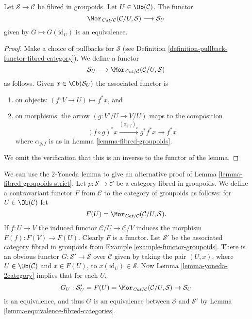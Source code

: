 \begin{lemma}
\label{lemma-yoneda-2category}
Let $\mathcal{S}\to \mathcal{C}$ be fibred in groupoids.
Let $U \in \Ob(\mathcal{C})$.
The functor
$$
\Mor_{\textit{Cat}/\mathcal{C}}(\mathcal{C}/U, \mathcal{S})
\longrightarrow
\mathcal{S}_U
$$
given by $G \mapsto G(\text{id}_U)$ is an equivalence.
\end{lemma}

\begin{proof}
Make a choice of pullbacks for $\mathcal{S}$
(see Definition \ref{definition-pullback-functor-fibred-category}).
We define a functor
$$
\mathcal{S}_U
\longrightarrow
\Mor_{\textit{Cat}/\mathcal{C}}(\mathcal{C}/U, \mathcal{S})
$$
as follows. Given
$x \in \Ob(\mathcal{S}_U)$
the associated functor is
\begin{enumerate}
\item on objects: $(f : V \to U) \mapsto f^*x$, and
\item on morphisms: the arrow $(g : V'/U \to V/U)$ maps to
the composition
$$
(f \circ g)^*x \xrightarrow{(\alpha_{g, f})_x} g^*f^*x \rightarrow f^*x
$$
where $\alpha_{g, f}$ is as in Lemma \ref{lemma-fibred-groupoids}.
\end{enumerate}
We omit the verification that this is an inverse to the functor
of the lemma.
\end{proof}

\begin{remark}
\label{remark-alternative-fibred-groupoids-strict}
We can use the $2$-Yoneda lemma to give an alternative proof of
Lemma \ref{lemma-fibred-groupoids-strict}.
Let $p : \mathcal{S} \to \mathcal{C}$ be a category fibred in groupoids.
We define a contravariant functor $F$ from $\mathcal{C}$ to the
category of groupoids as follows: for $U\in \Ob(\mathcal{C})$
let
$$
F(U) = \Mor_{\textit{Cat}/\mathcal{C}}(\mathcal{C}/U, \mathcal{S}).
$$
If $f : U \to V$ the induced functor $\mathcal{C}/U \to \mathcal{C}/V$
induces the morphism $F(f) : F(V) \to F(U)$. Clearly $F$ is a functor.
Let $\mathcal{S}'$ be the associated category fibred in groupoids from
Example \ref{example-functor-groupoids}.
There is an obvious functor $G : \mathcal{S}' \to \mathcal{S}$
over $\mathcal{C}$ given by taking the pair $(U, x)$, where
$U \in \Ob(\mathcal{C})$ and $x \in F(U)$, to
$x(\text{id}_U) \in \mathcal{S}$.  Now
Lemma \ref{lemma-yoneda-2category}
implies that for each $U$,
$$
G_U : \mathcal{S}'_U = F(U)=
\Mor_{\textit{Cat}/\mathcal{C}}(\mathcal{C}/U, \mathcal{S})
\to
\mathcal{S}_U
$$
is an equivalence, and thus $G$ is an equivalence between $\mathcal{S}$ and
$\mathcal{S}'$ by Lemma \ref{lemma-equivalence-fibred-categories}.
\end{remark}

